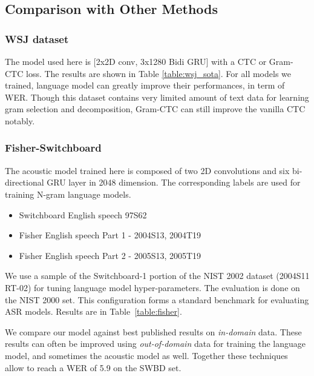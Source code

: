 \documentclass{article}
\begin{document}
\subsection{Comparison with Other Methods}

\subsubsection{WSJ dataset}

The model used here is [2x2D conv, 3x1280 Bidi GRU] with a CTC or Gram-CTC loss. The results are shown in Table \ref{table:wsj_sota}. For all models we trained, language model can greatly improve their performances, in term of WER. Though this dataset contains very limited amount of text data for learning gram selection and decomposition, Gram-CTC can still improve the vanilla CTC notably.


\subsubsection{Fisher-Switchboard}

The acoustic model trained here is composed of two 2D convolutions and six bi-directional GRU layer in 2048 dimension. The corresponding labels are used for training N-gram language models.
\begin{itemize}
\vspace{-10pt}
\item Switchboard English speech 97S62
\vspace{-7pt}
\item Fisher English speech Part 1 - 2004S13, 2004T19
\vspace{-7pt}
\item Fisher English speech Part 2 - 2005S13, 2005T19
\vspace{-10pt}
\end{itemize}
We use a sample of the Switchboard-1 portion of the NIST 2002 dataset (2004S11 RT-02) for tuning language model hyper-parameters. The evaluation is done on the NIST 2000 set. This configuration forms a standard benchmark for evaluating ASR models. Results are in Table~\ref{table:fisher}.

We compare our model against best published results on {\it in-domain} data. These results can often be improved using {\it out-of-domain} data for training the language model, and sometimes the acoustic model as well. Together these techniques allow \cite{xiong2016achieving} to reach a WER of 5.9 on the SWBD set.
\end{document}
